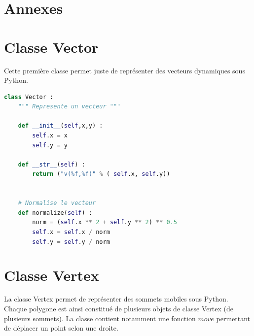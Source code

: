 \documentclass[a4paper,reqno]{article}
\newcommand{\pa}{\hspace{0.5cm}}
\begin{document}
\newpage

\pa 






\section*{Annexes}


\section*{Classe Vector}

Cette première classe permet juste de représenter des vecteurs dynamiques sous Python.


\begin{lstlisting}[language=Python,frame=single,caption=Création de la classe Vecteur]
class Vector : 
    """ Represente un vecteur """
    
    def __init__(self,x,y) : 
        self.x = x 
        self.y = y 
        
    def __str__(self) : 
        return ("v(%f,%f)" % ( self.x, self.y))
        
        
    # Normalise le vecteur 
    def normalize(self) : 
        norm = (self.x ** 2 + self.y ** 2) ** 0.5
        self.x = self.x / norm 
        self.y = self.y / norm 
\end{lstlisting}



\section*{Classe Vertex}

La classe Vertex permet de représenter des sommets mobiles sous Python. Chaque polygone est ainsi constitué de plusieurs objets de classe Vertex (de plusieurs sommets). La classe contient notamment une fonction $move$ permettant de déplacer un point selon une droite.
\end{document}
